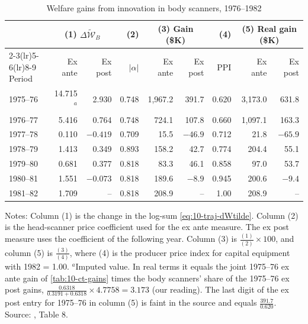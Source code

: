 \begin{table}[htbp]
\centering
\caption{Welfare gains from innovation in body scanners, 1976--1982}
\label{tab:10-ct-body}
\small
\setlength{\tabcolsep}{5pt}
\begin{tabular}{@{}lrrrrrrrr@{}}
\toprule
& \multicolumn{2}{c}{(1) $\Delta\widetilde{\mathcal{W}}_B$} & (2) & \multicolumn{2}{c}{(3) Gain (\$K)} & (4) &
  \multicolumn{2}{c}{(5) Real gain (\$K)} \\
\cmidrule(lr){2-3}\cmidrule(lr){5-6}\cmidrule(lr){8-9}
Period & Ex ante & Ex post & $|\alpha|$ & Ex ante & Ex post & PPI & Ex ante & Ex post \\
\midrule
1975--76 & 14.715$^a$ & 2.930 & 0.748 & 1,967.2 & 391.7 & 0.620 & 3,173.0 & 631.8 \\
1976--77 & 5.416 & 0.764 & 0.748 & 724.1 & 107.8 & 0.660 & 1,097.1 & 163.3 \\
1977--78 & 0.110 & $-0.419$ & 0.709 & 15.5 & $-46.9$ & 0.712 & 21.8 & $-65.9$ \\
1978--79 & 1.413 & 0.349 & 0.893 & 158.2 & 42.7 & 0.774 & 204.4 & 55.1 \\
1979--80 & 0.681 & 0.377 & 0.818 & 83.3 & 46.1 & 0.858 & 97.0 & 53.7 \\
1980--81 & 1.551 & $-0.073$ & 0.818 & 189.6 & $-8.9$ & 0.945 & 200.6 & $-9.4$ \\
1981--82 & 1.709 & -- & 0.818 & 208.9 & -- & 1.00 & 208.9 & -- \\
\bottomrule
\end{tabular}

\smallskip
\begin{minipage}{0.94\linewidth}
\footnotesize Notes: Column (1) is the change in the log-sum \eqref{eq:10-traj-dWtilde}. Column (2) is the head-scanner
price coefficient used for the ex ante measure. The ex post measure uses the coefficient of the following year. Column (3) is $\frac{(1)}{(2)}\times100$, and column (5) is
$\frac{(3)}{(4)}$, where (4) is the producer price index for capital equipment with 1982 = 1.00. $^a$Imputed value. In real terms it equals the joint 1975--76 ex ante gain of
\cref{tab:10-ct-gains} times the body scanners' share of the 1975--76 ex post gains,
$\frac{0.6318}{0.3191 + 0.6318}\times4.7758 = 3.173$ (our reading). The
last digit of the ex post entry for 1975--76 in column (5) is faint in the source and equals $\frac{391.7}{0.620}$.
Source: \citet{Trajtenberg1985}, Table 8.
\end{minipage}
\end{table}

